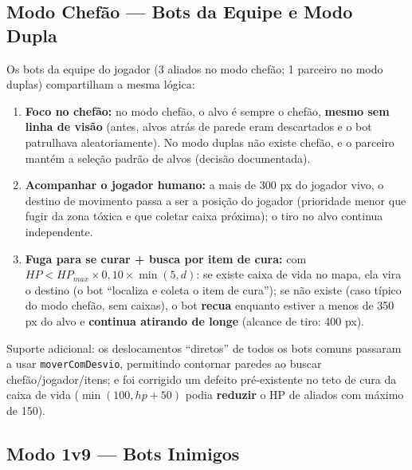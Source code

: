 \documentclass[a4paper,12pt]{article}
\begin{document}
\subsection{Modo Chefão --- Bots da Equipe e Modo Dupla}

Os bots da equipe do jogador (3 aliados no modo chefão; 1 parceiro no modo duplas)
compartilham a mesma lógica:

\begin{enumerate}
  \item \textbf{Foco no chefão:} no modo chefão, o alvo é sempre o chefão, \textbf{mesmo sem
        linha de visão} (antes, alvos atrás de parede eram descartados e o bot patrulhava
        aleatoriamente). No modo duplas não existe chefão, e o parceiro mantém a seleção
        padrão de alvos (decisão documentada).
  \item \textbf{Acompanhar o jogador humano:} a mais de 300 px do jogador vivo, o destino de
        movimento passa a ser a posição do jogador (prioridade menor que fugir da zona
        tóxica e que coletar caixa próxima); o tiro no alvo continua independente.
  \item \textbf{Fuga para se curar + busca por item de cura:} com
        $HP < HP_{max} \times 0{,}10 \times \min(5, d)$: se existe caixa de vida no mapa,
        ela vira o destino (o bot ``localiza e coleta o item de cura''); se não existe (caso
        típico do modo chefão, sem caixas), o bot \textbf{recua} enquanto estiver a menos de
        350 px do alvo e \textbf{continua atirando de longe} (alcance de tiro: 400 px).
\end{enumerate}

Suporte adicional: os deslocamentos ``diretos'' de todos os bots comuns passaram a usar
\texttt{moverComDesvio}, permitindo contornar paredes ao buscar chefão/jogador/itens; e foi
corrigido um defeito pré-existente no teto de cura da caixa de vida
($\min(100, hp+50)$ podia \textbf{reduzir} o HP de aliados com máximo de 150).

\subsection{Modo 1v9 --- Bots Inimigos}
\end{document}

